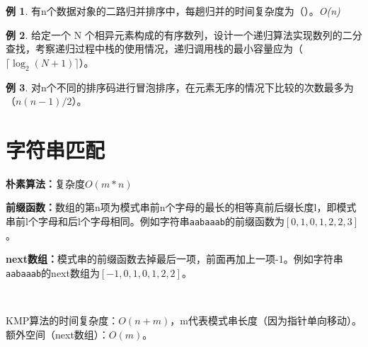 \documentclass[hyperref,a4paper,UTF8,12pt]{ctexart}
\theoremstyle{definition}
\newtheorem{example}{例}[section]
\begin{document}
\begin{example}
    有n个数据对象的二路归并排序中，每趟归并的时间复杂度为（\quad）。\quad\textit{O(n)}
\end{example}
\begin{example}
    给定一个 N 个相异元素构成的有序数列，设计一个递归算法实现数列的二分查找，考察递归过程中栈的使用情况，递归调用栈的最小容量应为（$\lceil \log_{2}(N+1) \rceil$）。
\end{example}
\begin{example}
    对n个不同的排序码进行冒泡排序，在元素无序的情况下比较的次数最多为（$n(n-1)/2$）。
\end{example}

\section{字符串匹配}

\textbf{朴素算法：}复杂度$O(m*n)$

\textbf{前缀函数：}数组的第n项为模式串前n个字母的最长的相等真前后缀长度l，即模式串前l个字母和后l个字母相同。例如字符串\verb|aabaaab|的前缀函数为$[0,1,0,1,2,2,3]$。

\textbf{next数组：}模式串的前缀函数去掉最后一项，前面再加上一项-1。例如字符串\verb|aabaaab|的next数组为$[-1,0,1,0,1,2,2]$。

\ 

KMP算法的时间复杂度：$O(n+m)$，m代表模式串长度（因为指针单向移动）。额外空间（next数组）：$O(m)$。
\end{document}
